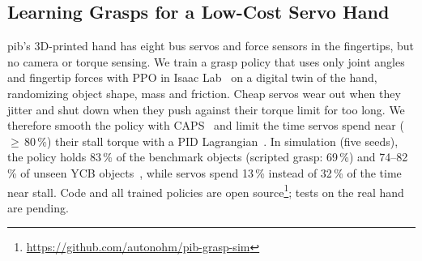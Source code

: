 \subsection{Learning Grasps for a Low-Cost Servo Hand}

pib's 3D-printed hand has eight bus servos and force sensors in the fingertips, but no camera or torque sensing. We train a
grasp policy that uses only joint angles and fingertip forces with PPO in Isaac Lab~\cite{mittal2025isaaclab} on a digital twin
of the hand, randomizing object shape, mass and friction. Cheap servos wear out when they jitter and shut down when they push
against their torque limit for too long. We therefore smooth the policy with CAPS~\cite{mysore2021caps} and limit the time
servos spend near (${\geq}\,80\,\%$) their stall torque with a PID Lagrangian~\cite{stooke2020pid}. In simulation (five
seeds), the policy holds 83\,\% of the benchmark objects (scripted grasp: 69\,\%) and 74--82\,\% of unseen YCB
objects~\cite{calli2015ycb}, while servos spend 13\,\% instead of 32\,\% of the time near stall. Code and all trained policies
are open source\footnote{\url{https://github.com/autonohm/pib-grasp-sim}}; tests on the real hand are pending.

